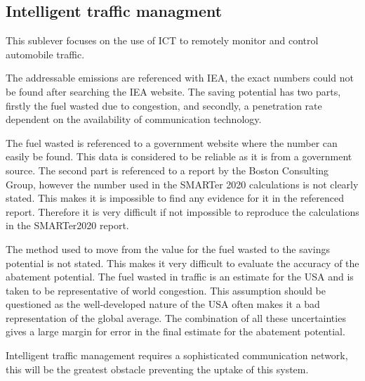 \subsection{Intelligent traffic managment}

This sublever focuses on the use of ICT to remotely monitor and control automobile traffic.

 The addressable emissions are referenced with IEA, the exact numbers could not be found after searching the IEA website. The saving potential has two parts, firstly the fuel wasted due to congestion, and secondly, a penetration rate dependent on the availability of communication technology.
 
 The fuel wasted is referenced to a government website where the number can easily be found. This data is considered to be reliable as it is from a government source. The second part is referenced to a report by the Boston Consulting Group, however the number used in the SMARTer 2020 calculations is not clearly stated. This makes it is impossible to find any evidence for it in the referenced report. Therefore it is very difficult if not impossible to reproduce the calculations in the SMARTer2020 report.
 
 The method used to move from the value for the fuel wasted to the savings potential is not stated. This makes it very difficult to evaluate the accuracy of the abatement potential. The fuel wasted in traffic is an estimate for the USA and is taken to be representative of world congestion. This assumption should be questioned as the well-developed nature of the USA often makes it a bad representation of the global average. The combination of all these uncertainties gives a large margin for error in the final estimate for the abatement potential.
 
 Intelligent traffic management requires a sophisticated communication network, this will be the greatest obstacle preventing the uptake of this system. 


